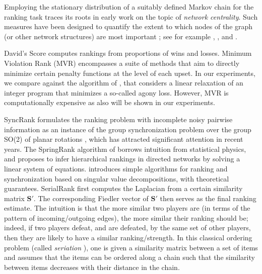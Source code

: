 \documentclass[nohyperref]{article}
\theoremstyle{plain}
\theoremstyle{definition}
\theoremstyle{remark}
\begin{document}
Employing the stationary distribution of a suitably defined Markov chain for the ranking task traces its roots in early work on the topic of \textit{network centrality}. Such measures have been designed to quantify the extent to which nodes of the graph (or other network structures) are most important \cite{booknewman}; see for example
\cite{Pageetal98}, \cite{bonacich1987power}, and \cite{negahban2017rank}.


David's Score \cite{david1987ranking} computes rankings from proportions of wins and losses. 
Minimum Violation Rank (MVR) \cite{MVR_1986} encompasses a suite of methods that aim to directly minimize certain penalty functions at the level of each upset.
In our experiments, we compare against the algorithm of  \cite{gupte2011finding}, that considers a linear relaxation of an  integer program that  minimizes a so-called agony loss. 
However, MVR is computationally expensive as also will be shown in our experiments.  


SyncRank \cite{cucuringu2016sync} formulates the ranking problem with incomplete noisy pairwise information as an instance of the group synchronization problem over the group SO(2) of planar rotations  \cite{sync}, which has attracted significant attention in recent years.  
The SpringRank algorithm of \cite{de2018physical}  borrows intuition from statistical physics, and proposes to infer hierarchical rankings in directed networks by solving a linear system of equations. 
\cite{d2021ranking} introduces simple algorithms for ranking and synchronization based on singular value decompositions, with theoretical guarantees. SerialRank \cite{fogel2014SerialRank} 
first computes the Laplacian from a certain similarity matrix $\mathbf{S'}$. The corresponding Fiedler vector 
of $\mathbf{S'}$
then serves as the final ranking estimate.
The intuition is that the more similar two players are  (in terms of the pattern of incoming/outgoing edges), the more similar their ranking should be; indeed, if two players defeat, and are defeated, by the same set of other players, then they are likely to have a similar ranking/strength. In this classical ordering problem (called \textit{seriation} \cite{atkins1998spectral}), one is given a similarity matrix between a set of items and assumes that the items can be ordered along a chain such that the similarity between items decreases with their distance  in the chain.
\end{document}
